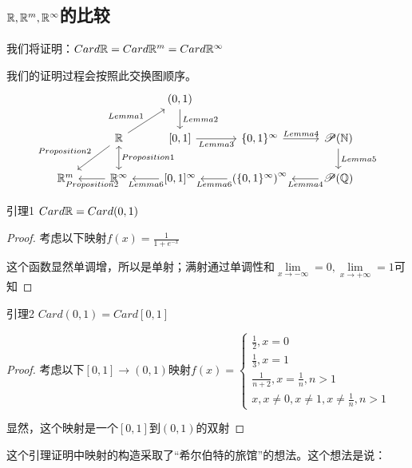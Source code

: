 \documentclass[12pt, a4paper, oneside, UTF8]{ctexbook}
\begin{document}
		\subsection{\texorpdfstring{$\mathbb{R},\mathbb{R}^m,\mathbb{R}^\infty$}势的比较}
			我们将证明：$Card \mathbb{R} = Card \mathbb{R}^m = Card \mathbb{R}^\infty$
			
			我们的证明过程会按照此交换图顺序。
			\[\begin{tikzcd}
				&& {(0,1)} \\
				& {\mathbb{R}} & {[0,1]} & {\{0,1\}^{\infty}} & {\mathscr{P}(\mathbb{N})} \\
				{\mathbb{R}^m} & {\mathbb{R}^\infty} & {[0,1]^\infty} & {\left(\{0,1\}^{\infty}\right)^\infty} & {\mathscr{P}(\mathbb{Q})}
				\arrow["{Lemma2}", from=1-3, to=2-3]
				\arrow["{Lemma1}", from=2-2, to=1-3]
				\arrow["{Proposition2}"', from=2-2, to=3-1]
				\arrow["{Proposition1}", leftrightarrow, from=2-2, to=3-2]
				\arrow["{Lemma3}"', from=2-3, to=2-4]
				\arrow["{Lemma4}", from=2-4, to=2-5]
				\arrow["{Lemma5}", from=2-5, to=3-5]
				\arrow["{Proposition2}", from=3-2, to=3-1]
				\arrow["{Lemma6}", from=3-3, to=3-2]
				\arrow["{Lemma6}", from=3-4, to=3-3]
				\arrow["{Lemma4}", from=3-5, to=3-4]
			\end{tikzcd}\]
			
			\begin{lemma}{引理1}{}
				$Card \mathbb{R} = Card (0,1)$
			\end{lemma}
			\begin{proof}
				考虑以下映射$f(x)=\frac{1}{1+e^{-x}}$
				
				这个函数显然单调增，所以是单射；满射通过单调性和$\lim\limits_{x\to - \infty}=0,\lim\limits_{x\to +\infty}=1$可知
			\end{proof}
			\begin{lemma}{引理2}{}
				$Card (0,1) = Card [0,1]$
			\end{lemma}
			\begin{proof}
				考虑以下$[0,1]\rightarrow(0,1)$映射$f(x)=\begin{cases}
					\frac{1}{2},x=0 \\
					\frac{1}{3},x=1 \\
					\frac{1}{n+2},x=\frac{1}{n},n>1 \\
					x,x\neq 0,x\neq 1,x\neq \frac{1}{n},n>1
					\end{cases}$
					
				显然，这个映射是一个$[0,1]$到$(0,1)$的双射
			\end{proof}
			这个引理证明中映射的构造采取了“希尔伯特的旅馆”的想法。这个想法是说：
			
\end{document}
